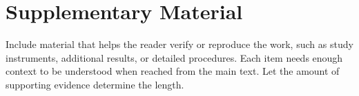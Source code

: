 \chapter{Supplementary Material}
\label{app:supplementary}

Include material that helps the reader verify or reproduce the work, such as
study instruments, additional results, or detailed procedures. Each item
needs enough context to be understood when reached from the main text. Let
the amount of supporting evidence determine the length.
